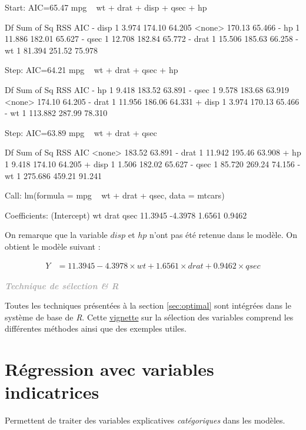 \documentclass[11pt,french]{report}
\newenvironment{moreInfo}[1]
	{\begin{mdframed}
	\textcolor{darkgray}{\huge \raisebox{-3.5pt}{\faInfo} 
	\hspace{0.5cm} \large\bfseries #1}\\[5pt]
	\normalsize
	\makebox[0.1\textwidth][l]{}	
	\begin{minipage}{10cm}}
	{	\end{minipage}
	\end{mdframed}}
\begin{document}
\begin{Schunk}
\begin{Soutput}
Start:  AIC=65.47
mpg ~ wt + drat + disp + qsec + hp

       Df Sum of Sq    RSS    AIC
- disp  1     3.974 174.10 64.205
<none>              170.13 65.466
- hp    1    11.886 182.01 65.627
- qsec  1    12.708 182.84 65.772
- drat  1    15.506 185.63 66.258
- wt    1    81.394 251.52 75.978

Step:  AIC=64.21
mpg ~ wt + drat + qsec + hp

       Df Sum of Sq    RSS    AIC
- hp    1     9.418 183.52 63.891
- qsec  1     9.578 183.68 63.919
<none>              174.10 64.205
- drat  1    11.956 186.06 64.331
+ disp  1     3.974 170.13 65.466
- wt    1   113.882 287.99 78.310

Step:  AIC=63.89
mpg ~ wt + drat + qsec

       Df Sum of Sq    RSS    AIC
<none>              183.52 63.891
- drat  1    11.942 195.46 63.908
+ hp    1     9.418 174.10 64.205
+ disp  1     1.506 182.02 65.627
- qsec  1    85.720 269.24 74.156
- wt    1   275.686 459.21 91.241

Call:
lm(formula = mpg ~ wt + drat + qsec, data = mtcars)

Coefficients:
(Intercept)           wt         drat         qsec  
    11.3945      -4.3978       1.6561       0.9462  
\end{Soutput}
\end{Schunk}
On remarque que la variable $disp$ et $hp$ n'ont pas été retenue dans le modèle. On obtient le modèle suivant :

\begin{align*}
Y &= 11.3945 - 4.3978 \times wt + 1.6561 \times drat + 0.9462 \times qsec
\end{align*}


\begin{moreInfo}{\color{Gray}\emph{Technique de sélection \& \emph{R}}
     \color{black}}
	Toutes les techniques présentées à la section \ref{sec:optimal} sont intégrées dans le système de base de \emph{R}. Cette \href{https://cran.r-project.org/web/packages/olsrr/vignettes/variable_selection.html}{vignette} sur la sélection des variables comprend les différentes méthodes ainsi que des exemples utiles.
\end{moreInfo}

\section{Régression avec variables indicatrices}
Permettent de traiter des variables explicatives \emph{catégoriques} dans les modèles.
\end{document}

